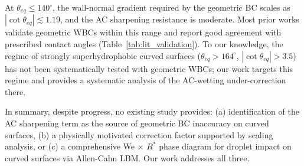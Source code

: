 At $\theta_{eq} \leq 140^\circ$, the wall-normal gradient required by the geometric BC scales as $|\cot\theta_{eq}| \lesssim 1.19$, and the AC sharpening resistance is moderate. Most prior works validate geometric WBCs within this range and report good agreement with prescribed contact angles (Table~\ref{tab:lit_validation}). To our knowledge, the regime of strongly superhydrophobic curved surfaces ($\theta_{eq} > 164^\circ$, $|\cot\theta_{eq}| > 3.5$) has not been systematically tested with geometric WBCs; our work targets this regime and provides a systematic analysis of the AC-wetting under-correction there.

In summary, despite progress, no existing study provides: (a) identification of the AC sharpening term as the source of geometric BC inaccuracy on curved surfaces, (b) a physically motivated correction factor supported by scaling analysis, or (c) a comprehensive We $\times$ $R^*$ phase diagram for droplet impact on curved surfaces via Allen-Cahn LBM. Our work addresses all three.
